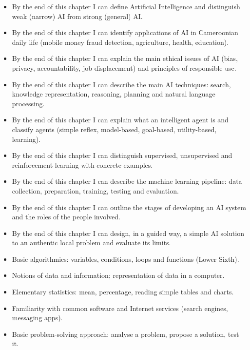 \documentclass[11pt]{article}
\begin{document}
\begin{objectifs}
\begin{itemize}
\item By the end of this chapter I can define Artificial Intelligence and distinguish weak (narrow) AI from strong (general) AI.
\item By the end of this chapter I can identify applications of AI in Cameroonian daily life (mobile money fraud detection, agriculture, health, education).
\item By the end of this chapter I can explain the main ethical issues of AI (bias, privacy, accountability, job displacement) and principles of responsible use.
\item By the end of this chapter I can describe the main AI techniques: search, knowledge representation, reasoning, planning and natural language processing.
\item By the end of this chapter I can explain what an intelligent agent is and classify agents (simple reflex, model-based, goal-based, utility-based, learning).
\item By the end of this chapter I can distinguish supervised, unsupervised and reinforcement learning with concrete examples.
\item By the end of this chapter I can describe the machine learning pipeline: data collection, preparation, training, testing and evaluation.
\item By the end of this chapter I can outline the stages of developing an AI system and the roles of the people involved.
\item By the end of this chapter I can design, in a guided way, a simple AI solution to an authentic local problem and evaluate its limits.
\end{itemize}
\end{objectifs}

\begin{prerequis}
\begin{itemize}
\item Basic algorithmics: variables, conditions, loops and functions (Lower Sixth).
\item Notions of data and information; representation of data in a computer.
\item Elementary statistics: mean, percentage, reading simple tables and charts.
\item Familiarity with common software and Internet services (search engines, messaging apps).
\item Basic problem-solving approach: analyse a problem, propose a solution, test it.
\end{itemize}
\end{prerequis}
\end{document}
